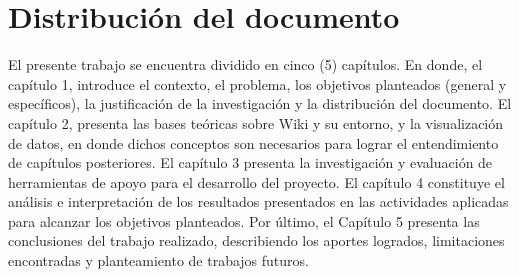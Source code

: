 \section{Distribución del documento}
El presente trabajo se encuentra dividido en cinco (5) capítulos. En donde, el capítulo 1, introduce el contexto, el problema, los objetivos planteados (general y específicos), la justificación de la investigación y la distribución del documento. El capítulo 2, presenta las bases teóricas sobre Wiki y su entorno, y la visualización de datos, en donde dichos conceptos son necesarios para lograr el entendimiento de capítulos posteriores. El capítulo 3 presenta la investigación y evaluación de herramientas de apoyo para el desarrollo del proyecto. El capítulo 4 constituye el análisis e interpretación  de los resultados presentados en las actividades aplicadas para alcanzar los objetivos planteados. Por último, el Capítulo 5 presenta las conclusiones del trabajo realizado, describiendo los aportes logrados, limitaciones encontradas y planteamiento de trabajos futuros.